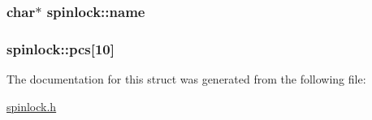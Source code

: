 \subsubsection[{\texorpdfstring{name}{name}}]{\setlength{\rightskip}{0pt plus 5cm}char$\ast$ spinlock\+::name}\hypertarget{structspinlock_afbec3274bf8ad9c421695a22f8d9d584}{}\label{structspinlock_afbec3274bf8ad9c421695a22f8d9d584}
\subsubsection[{\texorpdfstring{pcs}{pcs}}]{ spinlock\+::pcs\mbox{[}10\mbox{]}}\hypertarget{structspinlock_ac9ef3f16f664094198af0b9063e23fe0}{}\label{structspinlock_ac9ef3f16f664094198af0b9063e23fe0}


The documentation for this struct was generated from the following file\+:\begin{DoxyCompactItemize}
\item 
\hyperlink{spinlock_8h}{spinlock.\+h}\end{DoxyCompactItemize}
